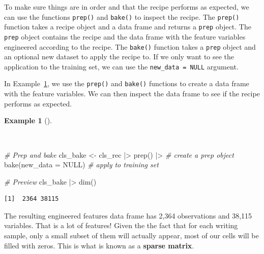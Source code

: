 \documentclass[
  letterpaper,
]{latex/krantz}
\newenvironment{Shaded}{\begin{snugshade}}{\end{snugshade}}
\newcommand{\AttributeTok}[1]{\textcolor[rgb]{0.00,0.00,0.00}{#1}}
\newcommand{\CommentTok}[1]{\textcolor[rgb]{0.00,0.00,0.00}{\textit{#1}}}
\newcommand{\ConstantTok}[1]{\textcolor[rgb]{0.00,0.00,0.00}{#1}}
\newcommand{\FunctionTok}[1]{\textcolor[rgb]{0.00,0.00,0.00}{#1}}
\newcommand{\NormalTok}[1]{\textcolor[rgb]{0.00,0.00,0.00}{#1}}
\newcommand{\OtherTok}[1]{\textcolor[rgb]{0.00,0.00,0.00}{#1}}
\newcommand{\SpecialCharTok}[1]{\textcolor[rgb]{0.00,0.00,0.00}{#1}}
\theoremstyle{definition}
\newtheorem{example}{Example}[chapter]
\theoremstyle{remark}
\begin{document}
To make sure things are in order and that the recipe performs as
expected, we can use the functions \texttt{prep()} and \texttt{bake()}
to inspect the recipe. The \texttt{prep()} function takes a recipe
object and a data frame and returns a \texttt{prep} object. The
\texttt{prep} object contains the recipe and the data frame with the
feature variables engineered according to the recipe. The
\texttt{bake()} function takes a \texttt{prep} object and an optional
new dataset to apply the recipe to. If we only want to see the
application to the training set, we can use the
\texttt{new\_data\ =\ NULL} argument.

In Example~\ref{exm-predict-class-recipe-prep}, we use the
\texttt{prep()} and \texttt{bake()} functions to create a data frame
with the feature variables. We can then inspect the data frame to see if
the recipe performs as expected.

\begin{example}[]\protect\hypertarget{exm-predict-class-recipe-prep}{}\label{exm-predict-class-recipe-prep}

~

\begin{Shaded}
\begin{Highlighting}[]
\CommentTok{\# Prep and bake}
\NormalTok{cls\_bake }\OtherTok{\textless{}{-}}
\NormalTok{  cls\_rec }\SpecialCharTok{|\textgreater{}}
  \FunctionTok{prep}\NormalTok{() }\SpecialCharTok{|\textgreater{}} \CommentTok{\# create a prep object}
  \FunctionTok{bake}\NormalTok{(}\AttributeTok{new\_data =} \ConstantTok{NULL}\NormalTok{) }\CommentTok{\# apply to training set}

\CommentTok{\# Preview}
\NormalTok{cls\_bake }\SpecialCharTok{|\textgreater{}} \FunctionTok{dim}\NormalTok{()}
\end{Highlighting}
\end{Shaded}

\begin{verbatim}
[1]  2364 38115
\end{verbatim}

\end{example}

The resulting engineered features data frame has 2,364 observations and
38,115 variables. That is a lot of features! Given the the fact that for
each writing sample, only a small subset of them will actually appear,
most of our cells will be filled with zeros. This is what is known as a
\textbf{sparse matrix}.
\end{document}
